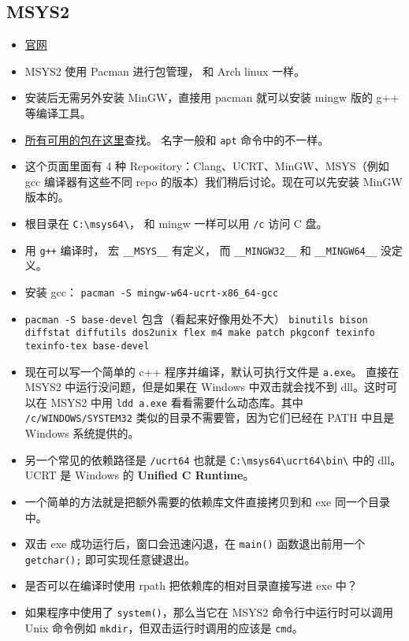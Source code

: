 \subsection{MSYS2}
\begin{itemize}
\item \href{https://www.msys2.org/}{官网}
\item MSYS2 使用 Pacman 进行包管理， 和 Arch linux 一样。
\item 安装后无需另外安装 MinGW，直接用 pacman 就可以安装 mingw 版的 g++ 等编译工具。
\item \href{https://packages.msys2.org/queue}{所有可用的包在这里}查找。 名字一般和 \verb|apt| 命令中的不一样。
\item 这个页面里面有 4 种 Repository：Clang、UCRT、MinGW、MSYS（例如 gcc 编译器有这些不同 repo 的版本）我们稍后讨论。现在可以先安装 MinGW 版本的。
\item 根目录在 \verb|C:\msys64\|， 和 mingw 一样可以用 \verb|/c| 访问 C 盘。
\item 用 \verb|g++| 编译时， 宏 \verb|__MSYS__| 有定义， 而 \verb|__MINGW32__| 和 \verb|__MINGW64__| 没定义。
\item 安装 gcc： \verb`pacman -S mingw-w64-ucrt-x86_64-gcc`
\item \verb|pacman -S base-devel| 包含（看起来好像用处不大） \verb`binutils bison diffstat diffutils dos2unix flex m4 make patch pkgconf texinfo texinfo-tex base-devel`
\item 现在可以写一个简单的 c++ 程序并编译，默认可执行文件是 \verb`a.exe`。 直接在 MSYS2 中运行没问题，但是如果在 Windows 中双击就会找不到 dll。这时可以在 MSYS2 中用 \verb`ldd a.exe` 看看需要什么动态库。其中 \verb`/c/WINDOWS/SYSTEM32` 类似的目录不需要管，因为它们已经在 PATH 中且是 Windows 系统提供的。
\item 另一个常见的依赖路径是 \verb`/ucrt64` 也就是 \verb`C:\msys64\ucrt64\bin\` 中的 dll。 UCRT 是 Windows 的 \textbf{Unified C Runtime}。
\item 一个简单的方法就是把额外需要的依赖库文件直接拷贝到和 exe 同一个目录中。
\item 双击 exe 成功运行后，窗口会迅速闪退，在 \verb`main()` 函数退出前用一个 \verb`getchar();` 即可实现任意键退出。
\item 是否可以在编译时使用 rpath 把依赖库的相对目录直接写进 exe 中？
\item 如果程序中使用了 \verb`system()`，那么当它在 MSYS2 命令行中运行时可以调用 Unix 命令例如 \verb`mkdir`，但双击运行时调用的应该是 \verb`cmd`。
\end{itemize}

